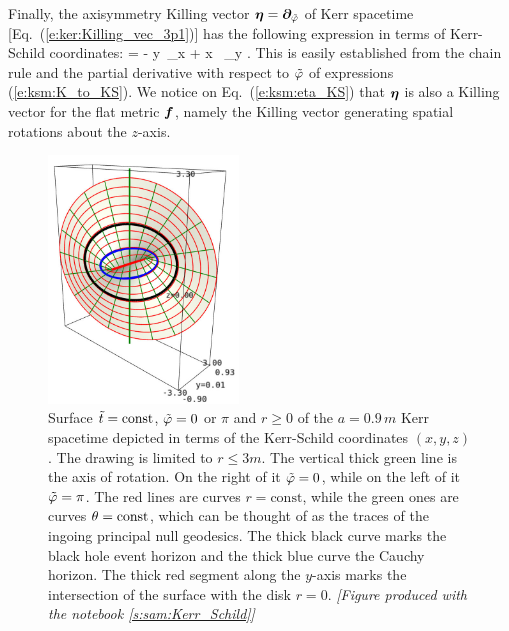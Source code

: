 Finally, the axisymmetry Killing vector $\bm{\eta} = \bm{\partial}_{\tilde\varphi}$
of Kerr spacetime [Eq.~(\ref{e:ker:Killing_vec_3p1})] has the following
expression in terms of Kerr-Schild coordinates:
\be \label{e:ksm:eta_KS}
    \w{\eta} = - y\, \wpar_x + x \, \wpar_y .
\ee
This is easily established from the chain rule and the partial
derivative with respect to ${\tilde\varphi}$ of expressions (\ref{e:ksm:K_to_KS}).
We notice on Eq.~(\ref{e:ksm:eta_KS}) that $\bm{\eta}$ is also a Killing vector for the flat metric $\bm{f}$,
namely the Killing vector generating spatial rotations about the $z$-axis.

\begin{figure}
\centerline{\includegraphics[width=0.45\textwidth]{ksm_phi_cut.jpg}}
\caption[]{\label{f:ksm:phi_cut} \footnotesize
Surface ${\tilde t}=\mathrm{const}$, ${\tilde\varphi}=0$ or $\pi$ and $r\geq 0$ of the $a=0.9\, m$
Kerr spacetime depicted in terms of
the Kerr-Schild coordinates $(x,y,z)$.
The drawing is limited to $r\leq 3 m$.
The vertical thick green line is
the axis of rotation. On the right of it ${\tilde\varphi}=0$, while on the left
of it ${\tilde\varphi}=\pi$.
The red lines are curves $r=\mathrm{const}$,
while the green ones are curves $\theta=\mathrm{const}$, which can be thought of as
the traces of the ingoing principal null geodesics.
The thick black curve marks the black hole event horizon and the thick blue curve the Cauchy horizon.
The thick red segment along the $y$-axis
marks the intersection of the surface with the disk $r=0$.
\textsl{[Figure produced with the notebook \ref{s:sam:Kerr_Schild}]}
}
\end{figure}




